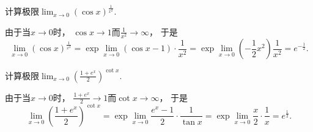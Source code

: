 \begin{example}
计算极限\(\lim_{x\to0} (\cos x)^{\frac1{x^2}}\).
\begin{solution}
由于当\(x\to0\)时，
\(\cos x \to 1\)而\(\frac1{x^2} \to \infty\)，
于是\begin{equation*}
	\lim_{x\to0} (\cos x)^{\frac1{x^2}}
	= \exp\lim_{x\to0} (\cos x - 1) \cdot \frac1{x^2}
	= \exp\lim_{x\to0} \left( -\frac12 x^2 \right) \frac1{x^2}
	= e^{-\frac12}.
\end{equation*}
\end{solution}
\end{example}

\begin{example}
计算极限\(\lim_{x\to0} \left( \frac{1+e^x}2 \right)^{\cot x}\).
\begin{solution}
由于当\(x\to0\)时，
\(\frac{1+e^x}2 \to 1\)而\(\cot x \to \infty\)，
于是\begin{equation*}
	\lim_{x\to0} \left( \frac{1+e^x}2 \right)^{\cot x}
	= \exp\lim_{x\to0} \frac{e^x-1}2 \cdot \frac1{\tan x}
	= \exp\lim_{x\to0} \frac{x}2 \cdot \frac1x
	= e^{\frac12}.
\end{equation*}
\end{solution}
\end{example}

